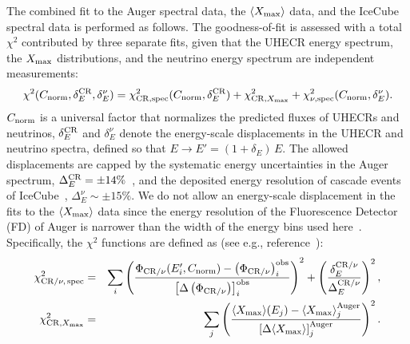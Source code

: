 \documentclass[aps,prd,onecolumn,superscriptaddress,11pt]{revtex4}
\begin{document}
The combined fit to the Auger spectral data, the $\langle X_{\rm max}\rangle$ data, and the IceCube spectral data is performed as follows. The goodness-of-fit is assessed with a total $\chi^2$ contributed by three separate fits, given that the UHECR energy spectrum, the $X_{\rm max}$ distributions, and the neutrino energy spectrum are independent measurements:
\begin{eqnarray}
\chi^2 (C_{\rm norm}, \delta_{E}^{\rm CR}, \delta_{E}^{\nu}) = \chi^2_{\rm CR,spec}(C_{\rm norm}, \delta_{E}^{\rm CR}) + \chi^2_{{\rm CR}, X_{\rm max}} + \chi^2_{\nu,\rm spec}(C_{\rm norm}, \delta_E^\nu).
\end{eqnarray}
$C_{\rm norm}$ is a universal factor that normalizes the predicted fluxes of UHECRs and neutrinos,  $\delta_{E}^{\rm CR}$ and $\delta_{E}^{\nu}$ denote the energy-scale displacements in the UHECR and neutrino spectra, defined so that $E\rightarrow E'=(1+\delta_E)\,E$. The allowed displacements are capped by the systematic energy uncertainties in the Auger spectrum, $\Delta_E^{\rm CR} = \pm14\%$~\cite{Aab:2015bza}, and the deposited energy resolution of cascade events of IceCube~\cite{IceCube_ICRC}, $\Delta_E^\nu \sim \pm15\%$. We do not allow an energy-scale displacement in the fits to the $\langle X_{\rm max}\rangle$ data since the energy resolution of the Fluorescence Detector (FD) of Auger is narrower than the width of the energy bins used here~\cite{2016arXiv161207155T}. Specifically, the $\chi^2$ functions are defined as (see e.g., reference~\cite{2015APh....62...66B}):
\begin{eqnarray}
\chi_{\rm CR/\nu,\,spec}^2&=&\sum_i\left(\frac{\Phi_{\rm CR/\nu} (E_i',C_{\rm norm})-\left(\Phi_{\rm CR/\nu}\right)^{\rm obs}_i}{{\left[\Delta\left(\Phi_{\rm CR/\nu}\right)\right]}^{\rm obs}_i}\right)^2 + \left(\frac{\delta_E^{\rm CR/\nu}}{\Delta_E^{\rm CR/\nu}}\right)^2, \\ \nonumber
\chi_{{\rm CR},X_{\rm max}}^2&=&\sum_{j}\left(\frac{\langle X_{\rm max}\rangle(E_j) - \langle X_{\rm max}\rangle^{\rm Auger}_j} {{\left[\Delta\langle  X_{\rm max}\rangle\right]}^{\rm Auger}_j }\right)^2. 
\end{eqnarray}
\end{document}
